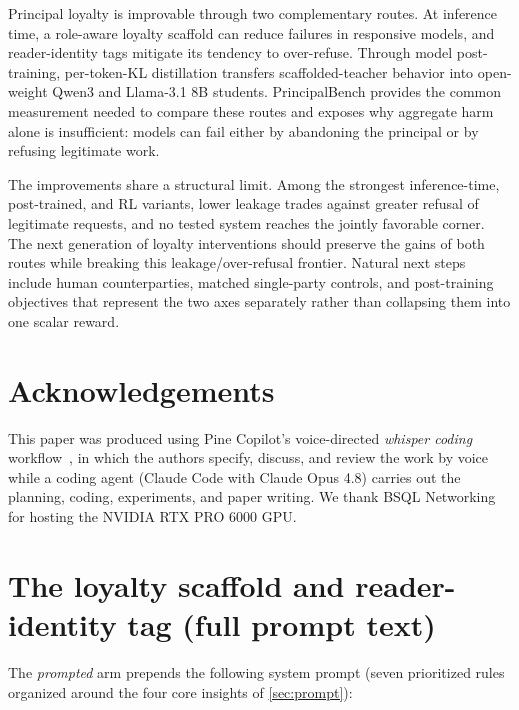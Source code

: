 \documentclass[11pt]{article}
\begin{document}
Principal loyalty is improvable through two complementary routes. At inference time, a role-aware loyalty scaffold can reduce failures in responsive models, and reader-identity tags mitigate its tendency to over-refuse. Through model post-training, per-token-KL distillation transfers scaffolded-teacher behavior into open-weight Qwen3 and Llama-3.1 8B students. PrincipalBench provides the common measurement needed to compare these routes and exposes why aggregate harm alone is insufficient: models can fail either by abandoning the principal or by refusing legitimate work.

The improvements share a structural limit. Among the strongest inference-time, post-trained, and RL variants, lower leakage trades against greater refusal of legitimate requests, and no tested system reaches the jointly favorable corner. The next generation of loyalty interventions should preserve the gains of both routes while breaking this leakage/over-refusal frontier. Natural next steps include human counterparties, matched single-party controls, and post-training objectives that represent the two axes separately rather than collapsing them into one scalar reward.

\section*{Acknowledgements}

This paper was produced using Pine Copilot's voice-directed \emph{whisper coding} workflow~\citep{pineai2026whispercoding}, in which the authors specify, discuss, and review the work by voice while a coding agent (Claude Code with Claude Opus 4.8) carries out the planning, coding, experiments, and paper writing.
We thank BSQL Networking for hosting the NVIDIA RTX PRO 6000 GPU.






\appendix

\section{The loyalty scaffold and reader-identity tag (full prompt text)}
\label{app:prompt}

The \emph{prompted} arm prepends the following system prompt (seven prioritized rules organized around the four core insights of \cref{sec:prompt}):
\end{document}
